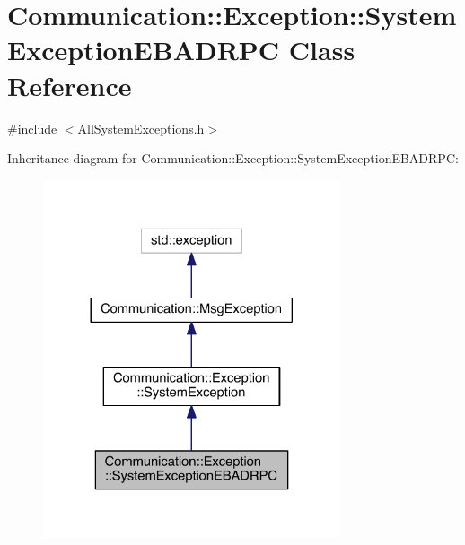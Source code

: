 \hypertarget{class_communication_1_1_exception_1_1_system_exception_e_b_a_d_r_p_c}{}\section{Communication\+:\+:Exception\+:\+:System\+Exception\+E\+B\+A\+D\+R\+P\+C Class Reference}
\label{class_communication_1_1_exception_1_1_system_exception_e_b_a_d_r_p_c}


{\ttfamily \#include $<$All\+System\+Exceptions.\+h$>$}



Inheritance diagram for Communication\+:\+:Exception\+:\+:System\+Exception\+E\+B\+A\+D\+R\+P\+C\+:\nopagebreak
\begin{figure}[H]
\begin{center}
\leavevmode
\includegraphics[width=248pt]{class_communication_1_1_exception_1_1_system_exception_e_b_a_d_r_p_c__inherit__graph}
\end{center}
\end{figure}


